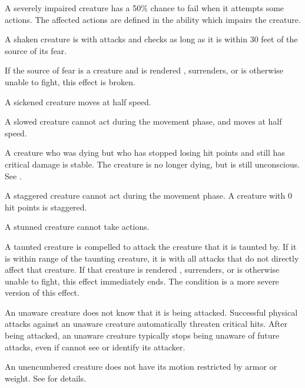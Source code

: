  A severely impaired creature has a 50\% chance to fail when it attempts some actions. The affected actions are defined in the ability which impairs the creature.

 A shaken creature is \impaired with attacks and checks as long as it is within 30 feet of the source of its fear.

If the source of fear is a creature and is rendered \helpless, surrenders, or is otherwise unable to fight, this effect is broken.

 A sickened creature moves at half speed.

 A slowed creature cannot act during the movement phase, and moves at half speed.

 A creature who was dying but who has stopped losing hit points and still has critical damage is stable. The creature is no longer dying, but is still unconscious. See .

 A staggered creature cannot act during the movement phase. A creature with 0 hit points is staggered.

 A stunned creature cannot take actions.

 A taunted creature is compelled to attack the creature that it is taunted by.
If it is within \rngmed range of the taunting creature, it is \severelyimpaired with all attacks that do not directly affect that creature.
If that creature is rendered \helpless, surrenders, or is otherwise unable to fight, this effect immediately ends.
The  condition is a more severe version of this effect.

 An unaware creature does not know that it is being attacked. Successful physical attacks against an unaware creature automatically threaten critical hits. After being attacked, an unaware creature typically stops being unaware of future attacks, even if cannot see or identify its attacker.

 An unencumbered creature does not have its motion restricted by armor or weight. See  for details.
